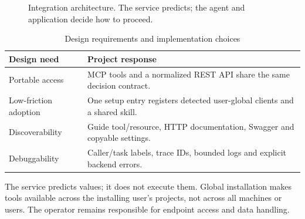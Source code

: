 \documentclass[10pt,a4paper]{article}
\begin{document}
\begin{figure}[H]
\centering
{}
\caption{Integration architecture. The service predicts; the agent and application decide how to proceed.}
\end{figure}
\begin{table}[H]
\centering\small
\renewcommand{\arraystretch}{1.15}
\begin{tabularx}{\linewidth}{@{}YY@{}}
\toprule
\textbf{Design need} & \textbf{Project response} \\
\midrule
Portable access & MCP tools and a normalized REST API share the same decision contract. \\
Low-friction adoption & One setup entry registers detected user-global clients and a shared skill. \\
Discoverability & Guide tool/resource, HTTP documentation, Swagger and copyable settings. \\
Debuggability & Caller/task labels, trace IDs, bounded logs and explicit backend errors. \\
\bottomrule
\end{tabularx}
\caption{Design requirements and implementation choices}
\end{table}
The service predicts values; it does not execute them. Global installation makes tools available across the installing user's projects, not across all machines or users. The operator remains responsible for endpoint access and data handling.
\end{document}
